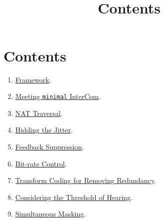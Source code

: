 

\title{\TM{}\\Contents}

\maketitle

\section*{Contents}

\begin{enumerate}
\item \href{https://tecnologias-multimedia.github.io/contents/framework/}{Framework}.
\item \href{https://tecnologias-multimedia.github.io/contents/minimal/}{Meeting \texttt{minimal} InterCom}.
\item \href{https://tecnologias-multimedia.github.io/contents/NAT_traversal/}{NAT Traversal}.
\item \href{https://tecnologias-multimedia.github.io/contents/jitter/}{Hidding the Jitter}.
\item \href{https://tecnologias-multimedia.github.io/contents/feedback_suppression/}{Feedback Suppression}.
\item \href{https://tecnologias-multimedia.github.io/contents/BR_control/}{Bit-rate Control}.
\item \href{https://tecnologias-multimedia.github.io/contents/transform_coding/}{Transform Coding for Removing Redundancy}.
\item \href{https://tecnologias-multimedia.github.io/contents/threshold_of_hearing/}{Considering the Threshold of Hearing}.
\item \href{https://tecnologias-multimedia.github.io/contents/simultaneous_masking/}{Simultaneous Masking}.
\end{enumerate}


%
